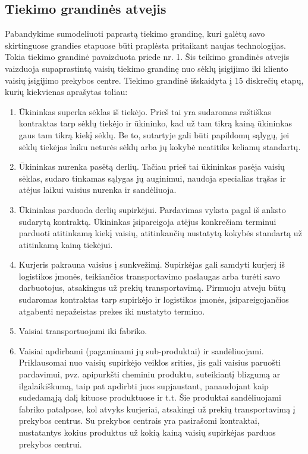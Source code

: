 \subsection{Tiekimo grandinės atvejis}

Pabandykime sumodeliuoti paprastą tiekimo grandinę, kuri galėtų savo skirtinguose grandies etapuose būti praplėsta pritaikant naujas technologijas. Tokia tiekimo grandinė pavaizduota priede nr. 1. Šis teikimo grandinės atvejis vaizduoja supaprastintą vaisių tiekimo grandinę nuo sėklų įsigijimo iki kliento vaisių įsigijimo prekybos centre. Tiekimo grandinė išskaidyta į 15 diskrečių etapų, kurių kiekvienas aprašytas toliau:
\begin{enumerate}
    \item Ūkininkas superka sėklas iš tiekėjo. Prieš tai yra sudaromas raštiškas kontraktas tarp sėklų tiekėjo ir ūkininko, kad už tam tikrą kainą ūkininkas gaus tam tikrą kiekį sėklų. Be to, sutartyje gali būti papildomų sąlygų, jei sėklų tiekėjas laiku neturės sėklų arba jų kokybė neatitiks keliamų standartų.
    \item Ūkininkas nurenka pasėtą derlių. Tačiau prieš tai ūkininkas pasėja vaisių sėklas, sudaro tinkamas sąlygas jų auginimui, naudoja specialias trąšas ir atėjus laikui vaisius nurenka ir sandėliuoja.
    \item Ūkininkas parduoda derlių supirkėjui. Pardavimas vyksta pagal iš anksto sudarytą kontraktą. Ūkininkas įsipareigoja atėjus konkrečiam terminui parduoti atitinkamą kiekį vaisių, atitinkančių nustatytą kokybės standartą už atitinkamą kainą tiekėjui.
    \item Kurjeris pakrauna vaisius į sunkvežimį. Supirkėjas gali samdyti kurjerį iš logistikos įmonės, teikiančios transportavimo paslaugas arba turėti savo darbuotojus, atsakingus už prekių transportavimą. Pirmuoju atveju būtų sudaromas kontraktas tarp supirkėjo ir logistikos įmonės, įsipareigojančios atgabenti nepažeistas prekes iki nustatyto termino.
    \item Vaisiai transportuojami iki fabriko.
    \item Vaisiai apdirbami (pagaminami jų sub-produktai) ir sandėliuojami. Priklausomai nuo vaisių supirkėjo veiklos srities, jis gali vaisius paruošti pardavimui, pvz. apipurkšti cheminiu produktu, suteikiantį blizgumą ar ilgalaikiškumą, taip pat apdirbti juos supjaustant, panaudojant kaip sudedamąją dalį kituose produktuose ir t.t. Šie produktai sandėliuojami fabriko patalpose, kol atvyks kurjeriai, atsakingi už prekių transportavimą į prekybos centrus. Su prekybos centrais yra pasirašomi kontraktai, nustatantys kokius produktus už kokią kainą vaisių supirkėjas parduos prekybos centrui.

\end{enumerate}

